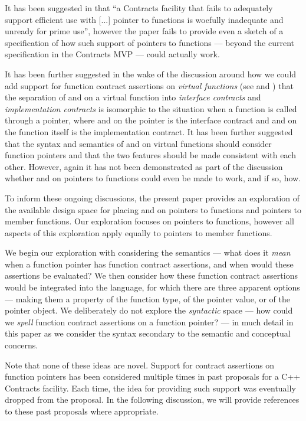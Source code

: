 It has been suggested in \cite{P3173R0} that ``a Contracts facility that fails to adequately support efficient use with [...] pointer to functions is woefully inadequate and unready for prime use'', however the paper fails to provide even a sketch of a specification of how such support of pointers to functions --- beyond the current specification in the Contracts MVP --- could actually work.

It has been further suggested in the wake of the discussion around how we could add support for function contract assertions on \emph{virtual functions} (see \cite{P3097R0} and \cite{P3165R0}) that the separation of  and  on a virtual function into \emph{interface contracts} and \emph{implementation contracts} is isomorphic to the situation when a function is called through a pointer, where  and  on the pointer is the interface contract and  and  on the function itself is the implementation contract. It has been further suggested that the syntax and semantics of  and  on virtual functions should consider function pointers and that the two features should be made consistent with each other. However, again it has not been demonstrated as part of the discussion whether  and  on pointers to functions could even be made to work, and if so, how.

To inform these ongoing discussions, the present paper provides an exploration of the available design space for placing  and  on pointers to functions and pointers to member functions. Our exploration focuses on pointers to functions, however all aspects of this exploration apply equally to pointers to member functions.

We begin our exploration with considering the semantics --- what does it \emph{mean} when a function pointer has function contract assertions, and when would these assertions be evaluated? We then consider how these function contract assertions would be integrated into the language, for which there are three apparent options --- making them a property of the function type, of the pointer value, or of the pointer object. We deliberately do not explore the \emph{syntactic} space --- how could we \emph{spell} function contract assertions on a function pointer? --- in much detail in this paper as we consider the syntax secondary to the semantic and conceptual concerns. 

Note that none of these ideas are novel. Support for contract assertions on function pointers has been considered multiple times in past proposals for a C++ Contracts facility. Each time, the idea for providing such support was eventually dropped from the proposal. In the following discussion, we will provide references to these past proposals where appropriate.

